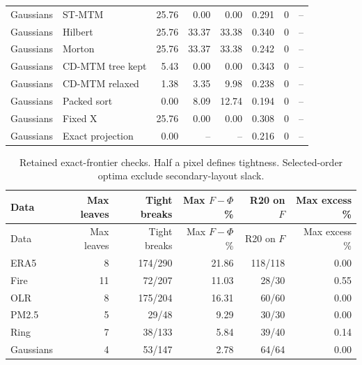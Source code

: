 \begin{longtable}{llrrrrrr}
Gaussians & ST-MTM & 25.76 & 0.00 & 0.00 & 0.291 & 0 & --\\
Gaussians & Hilbert & 25.76 & 33.37 & 33.38 & 0.340 & 0 & --\\
Gaussians & Morton & 25.76 & 33.37 & 33.38 & 0.242 & 0 & --\\
Gaussians & CD-MTM tree kept & 5.43 & 0.00 & 0.00 & 0.343 & 0 & --\\
Gaussians & CD-MTM relaxed & 1.38 & 3.35 & 9.98 & 0.238 & 0 & --\\
Gaussians & Packed sort & 0.00 & 8.09 & 12.74 & 0.194 & 0 & --\\
Gaussians & Fixed X & 25.76 & 0.00 & 0.00 & 0.308 & 0 & --\\
Gaussians & Exact projection & 0.00 & -- & -- & 0.216 & 0 & --\\
\end{longtable}\endgroup

\begingroup\small\setlength{\tabcolsep}{4pt}
\begin{longtable}{lrrrrr}
\caption{Retained exact-frontier checks. Half a pixel defines tightness. Selected-order optima exclude secondary-layout slack.}\\\toprule
Data & Max leaves & Tight breaks & Max $F-\Phi$ \% & R20 on $F$ & Max excess \%\\\midrule\endfirsthead
\toprule Data & Max leaves & Tight breaks & Max $F-\Phi$ \% & R20 on $F$ & Max excess \%\\\midrule\endhead
\bottomrule\endfoot
ERA5 & 8 & 174/290 & 21.86 & 118/118 & 0.00\\
Fire & 11 & 72/207 & 11.03 & 28/30 & 0.55\\
OLR & 8 & 175/204 & 16.31 & 60/60 & 0.00\\
PM2.5 & 5 & 29/48 & 9.29 & 30/30 & 0.00\\
Ring & 7 & 38/133 & 5.84 & 39/40 & 0.14\\
Gaussians & 4 & 53/147 & 2.78 & 64/64 & 0.00\\
\end{longtable}\endgroup

